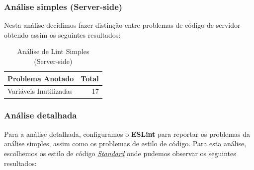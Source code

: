 \documentclass[a4paper,12pt]{article} %
\begin{document}
\newpage
\subsubsection{Análise simples (Server-side)}
Nesta análise decidimos fazer distinção entre problemas de código de servidor obtendo assim os seguintes resultados:

\vspace{1cm}
\begin{table}[H]
	\centering
	\begin{tabular}{|l|r|}
		\hline
		\textbf{Problema Anotado} & \textbf{Total} \\
		\hline
		Variáveis Inutilizadas & 17 \\
		\hline
	\end{tabular}
	\caption{Análise de Lint Simples (Server-side)}
\end{table}

\subsubsection{Análise detalhada}
Para a análise detalhada, configuramos o \textbf{ESLint} para reportar os problemas da análise simples, assim como os problemas de estilo de código. Para esta análise, escolhemos os estilo de código \hyperlink{https://github.com/standard/standard}{\textit{Standard}} onde pudemos observar os seguintes resultados:
\end{document}

